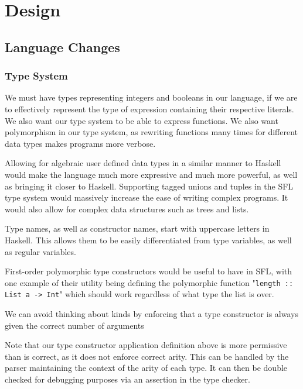 \section{Design}

\subsection{Language Changes}
\subsubsection{Type System}
We must have types representing integers and booleans in our language, if we are to effectively represent the type of expression containing their respective literals. We also want our type system to be able to express functions. We also want polymorphism in our type system, as rewriting functions many times for different data types makes programs more verbose. 

Allowing for algebraic user defined data types in a similar manner to Haskell would make the language much more expressive and much more powerful, as well as bringing it closer to Haskell. Supporting tagged unions and tuples in the \ac{SFL} type system would massively increase the ease of writing complex programs. It would also allow for complex data structures such as trees and lists. 

Type names, as well as constructor names, start with uppercase letters in Haskell. This allows them to be easily differentiated from type variables, as well as regular variables. 

First-order polymorphic type constructors would be useful to have in \ac{SFL}, with one example of their utility being defining the polymorphic function "\verb|length :: List a -> Int|" which should work regardless of what type the list is over.



We can avoid thinking about kinds by enforcing that a type constructor is always given the correct number of arguments



Note that our type constructor application definition above is more permissive than is correct, as it does not enforce correct arity. This can be handled by the parser maintaining the context of the arity of each type. It can then be double checked for debugging purposes via an assertion in the type checker. 

